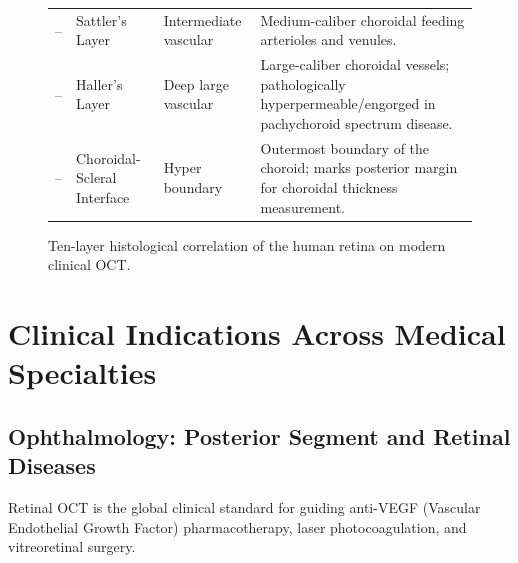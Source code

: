 \documentclass[11pt,a4paper]{article}
\begin{document}
\begin{figure}[htbp]
\begin{tabular}{cllp{7.2cm}}
-- & Sattler's Layer & Intermediate vascular & Medium-caliber choroidal feeding arterioles and venules. \\
-- & Haller's Layer & Deep large vascular & Large-caliber choroidal vessels; pathologically hyperpermeable/engorged in pachychoroid spectrum disease. \\
-- & Choroidal-Scleral Interface & Hyper boundary & Outermost boundary of the choroid; marks posterior margin for choroidal thickness measurement. \\
\bottomrule
\end{tabular}
\caption{Ten-layer histological correlation of the human retina on modern clinical OCT.}
\label{tab:retinal_layers}
\end{figure}

\section{Clinical Indications Across Medical Specialties}

\subsection{Ophthalmology: Posterior Segment and Retinal Diseases}

Retinal OCT is the global clinical standard for guiding anti-VEGF (Vascular Endothelial Growth Factor) pharmacotherapy, laser photocoagulation, and vitreoretinal surgery.
\end{document}
